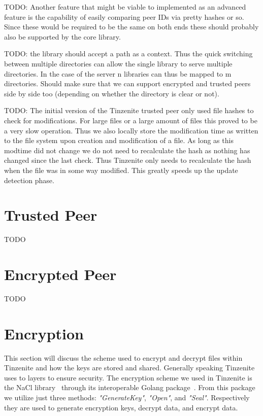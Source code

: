 TODO: Another feature that might be viable to implemented as an advanced feature is the capability of easily comparing peer IDs via pretty hashes or so.
Since these would be required to be the same on both ends these should probably also be supported by the core library.

TODO: the library should accept a path as a context.
Thus the quick switching between multiple directories can allow the single library to serve multiple directories.
In the case of the server n libraries can thus be mapped to m directories.
Should make sure that we can support encrypted and trusted peers side by side too (depending on whether the directory is clear or not).

TODO: The initial version of the Tinzenite trusted peer only used file hashes to check for modifications.
For large files or a large amount of files this proved to be a very slow operation.
Thus we also locally store the modification time as written to the file system upon creation and modification of a file.
As long as this modtime did not change we do not need to recalculate the hash as nothing has changed since the last check.
Thus Tinzenite only needs to recalculate the hash when the file was in some way modified.
This greatly speeds up the update detection phase.

\section{Trusted Peer}

TODO

\section{Encrypted Peer}

TODO

\section{Encryption}
\label{sec:Encryption}

This section will discuss the scheme used to encrypt and decrypt files within Tinzenite and how the keys are stored and shared.
Generally speaking Tinzenite uses to layers to ensure security.
The encryption scheme we used in Tinzenite is the NaCl library~\cite{bernstein2012security} through its interoperable Golang package~\cite{web:site:golang:box}.%
From this package we utilize just three methods: \textit{"GenerateKey"}, \textit{"Open"}, and \textit{"Seal"}.
Respectively they are used to generate encryption keys, decrypt data, and encrypt data.

